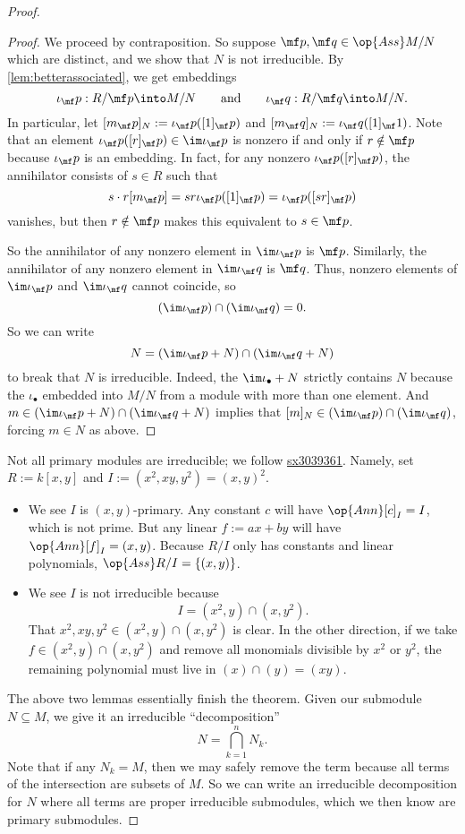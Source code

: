 \begin{proof}
\begin{proof}
		We proceed by contraposition. So suppose $\mf p,\mf q\in\op{Ass}M/N$ which are distinct, and we show that $N$ is not irreducible. By \autoref{lem:betterassociated}, we get embeddings
		\[\iota_\mf p:R/\mf p\into M/N\qquad\text{and}\qquad \iota_\mf q:R/\mf q\into M/N.\]
		In particular, let $[m_\mf p]_N:=\iota_\mf p([1]_\mf p)$ and $[m_\mf q]_N:=\iota_\mf q([1]_\mf 1)$. Note that an element $\iota_\mf p([r]_\mf p)\in\im\iota_\mf p$ is nonzero if and only if $r\notin\mf p$ because $\iota_\mf p$ is an embedding. In fact, for any nonzero $\iota_\mf p([r]_\mf p)$, the annihilator consists of $s\in R$ such that
		\[s\cdot r[m_\mf p]=sr\iota_\mf p([1]_\mf p)=\iota_\mf p([sr]_\mf p)\]
		vanishes, but then $r\notin\mf p$ makes this equivalent to $s\in\mf p$.

		So the annihilator of any nonzero element in $\im\iota_\mf p$ is $\mf p$. Similarly, the annihilator of any nonzero element in $\im\iota_\mf q$ is $\mf q$. Thus, nonzero elements of $\im\iota_\mf p$ and $\im\iota_\mf q$ cannot coincide, so
		\[(\im\iota_\mf p)\cap(\im\iota_\mf q)=0.\]
		So we can write
		\[N=(\im\iota_\mf p+N)\cap(\im\iota_\mf q+N)\]
		to break that $N$ is irreducible. Indeed, the $\im\iota_\bullet+N$ strictly contains $N$ because the $\iota_\bullet$ embedded into $M/N$ from a module with more than one element. And $m\in(\im\iota_\mf p+N)\cap(\im\iota_\mf q+N)$ implies that $[m]_N\in(\im\iota_\mf p)\cap(\im\iota_\mf q)$, forcing $m\in N$ as above.
	\end{proof}
	\begin{remark}
		Not all primary modules are irreducible; we follow \href{https://math.stackexchange.com/a/3040085/869257}{sx3039361}. Namely, set $R:=k[x,y]$ and $I:=(x^2,xy,y^2)=(x,y)^2$.
		\begin{itemize}
			\item We see $I$ is $(x,y)$-primary. Any constant $c$ will have $\op{Ann}[c]_I=I$, which is not prime. But any linear $f:=ax+by$ will have $\op{Ann}[f]_I=(x,y)$. Because $R/I$ only has constants and linear polynomials, $\op{Ass}R/I=\{(x,y)\}$.
			\item We see $I$ is not irreducible because
			\[I=\left(x^2,y\right)\cap\left(x,y^2\right).\]
			That $x^2,xy,y^2\in\left(x^2,y\right)\cap\left(x,y^2\right)$ is clear. In the other direction, if we take $f\in\left(x^2,y\right)\cap\left(x,y^2\right)$ and remove all monomials divisible by $x^2$ or $y^2$, the remaining polynomial must live in $(x)\cap(y)=(xy)$.
		\end{itemize}
	\end{remark}
	The above two lemmas essentially finish the theorem. Given our submodule $N\subseteq M$, we give it an irreducible ``decomposition''
	\[N=\bigcap_{k=1}^nN_k.\]
	Note that if any $N_k=M$, then we may safely remove the term because all terms of the intersection are subsets of $M$. So we can write an irreducible decomposition for $N$ where all terms are proper irreducible submodules, which we then know are primary submodules.
\end{proof}
